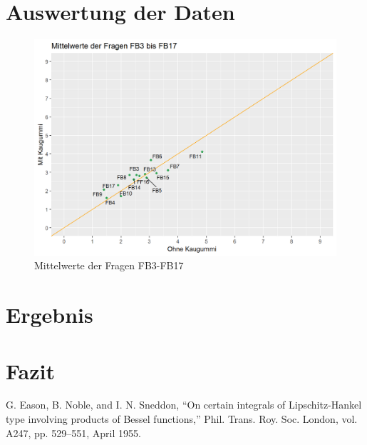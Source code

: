 \documentclass[conference]{IEEEtran}
\begin{document}
\section{Auswertung der Daten}
\begin{figure}
	\includegraphics[scale=0.4]{Mittelwert3-17.png}
	\caption{Mittelwerte der Fragen FB3-FB17}
	\label{img:mittelwerte}
\end{figure}
\section{Ergebnis}

\section{Fazit}



\begin{thebibliography}{00}
 G. Eason, B. Noble, and I. N. Sneddon, ``On certain integrals of Lipschitz-Hankel type involving products of Bessel functions,'' Phil. Trans. Roy. Soc. London, vol. A247, pp. 529--551, April 1955.

\end{thebibliography}
\end{document}

